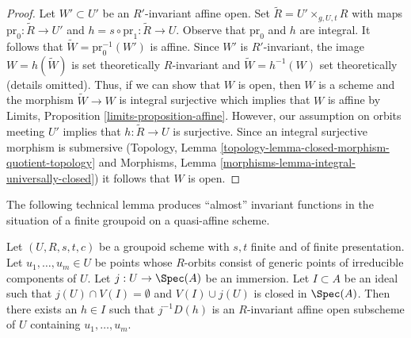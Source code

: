 \begin{proof}
Let $W' \subset U'$ be an $R'$-invariant affine open.
Set $\tilde R = U' \times_{g, U, t} R$ with maps
$\text{pr}_0 : \tilde R \to U'$ and $h = s \circ \text{pr}_1 : \tilde R \to U$.
Observe that $\text{pr}_0$ and $h$ are integral.
It follows that $\tilde W = \text{pr}_0^{-1}(W')$ is affine.
Since $W'$ is $R'$-invariant, the image
$W = h(\tilde W)$ is set theoretically $R$-invariant and
$\tilde W = h^{-1}(W)$ set theoretically (details omitted).
Thus, if we can show that $W$ is open, then $W$ is a scheme
and the morphism $\tilde W \to W$ is integral surjective
which implies that $W$ is affine by
Limits, Proposition \ref{limits-proposition-affine}.
However, our assumption on orbits meeting $U'$ implies
that $h : \tilde R \to U$ is surjective. Since an
integral surjective morphism is submersive
(Topology, Lemma \ref{topology-lemma-closed-morphism-quotient-topology}
and Morphisms, Lemma \ref{morphisms-lemma-integral-universally-closed})
it follows that $W$ is open.
\end{proof}

\noindent
The following technical lemma produces ``almost'' invariant
functions in the situation of a finite groupoid on a quasi-affine
scheme.

\begin{lemma}
\label{lemma-find-almost-invariant-function}
Let $(U, R, s, t, c)$ be a groupoid scheme with $s, t$ finite and of
finite presentation. Let $u_1, \ldots, u_m \in U$ be points whose $R$-orbits
consist of generic points of irreducible components of $U$.
Let $j : U \to \Spec(A)$ be an immersion.
Let $I \subset A$ be an ideal such that $j(U) \cap V(I) = \emptyset$
and $V(I) \cup j(U)$ is closed in $\Spec(A)$.
Then there exists an $h \in I$ such that $j^{-1}D(h)$
is an $R$-invariant affine open subscheme of $U$ containing
$u_1, \ldots, u_m$.
\end{lemma}

